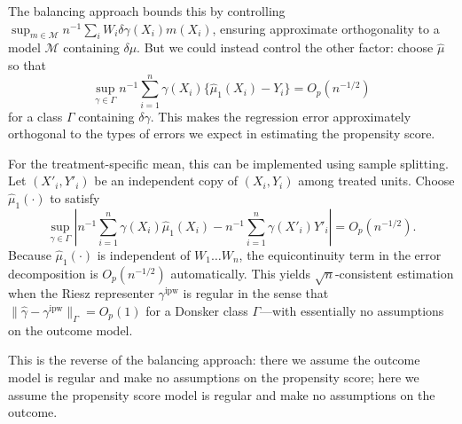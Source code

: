 \documentclass{article}
\theoremstyle{definition}
\newcommand{\model}{\mathcal{M}}
\newcommand{\<}{\langle}
\renewcommand{\>}{\rangle}
\begin{document}
\begin{refsection}
The balancing approach bounds this by controlling $\sup_{m \in \model} n^{-1} \sum_i W_i \delta\gamma(X_i) m(X_i)$, ensuring approximate orthogonality to a model $\model$ containing $\delta \mu$. But we could instead control the other factor: choose $\hat \mu$ so that
\begin{equation}
\sup_{\gamma \in \Gamma} n^{-1} \sum_{i=1}^n \gamma(X_i) \{\hat \mu_1(X_i) - Y_i\} = O_p(n^{-1/2})
\end{equation}
for a class $\Gamma$ containing $\delta\gamma$. This makes the regression error approximately orthogonal to the types of errors we expect in estimating the propensity score.

For the treatment-specific mean, this can be implemented using sample splitting. Let $(X'_i, Y'_i)$ be an independent copy of $(X_i, Y_i)$ among treated units. Choose $\hat \mu_1(\cdot)$ to satisfy
\begin{equation}
\sup_{\gamma \in \Gamma} \left|n^{-1} \sum_{i=1}^n \gamma(X_i) \hat \mu_1(X_i) - n^{-1} \sum_{i=1}^n \gamma(X'_i) Y'_i\right| = O_p(n^{-1/2}).
\end{equation}
Because $\hat \mu_1(\cdot)$ is independent of $W_1 \ldots W_n$, the equicontinuity term in the error decomposition is $O_p(n^{-1/2})$ automatically. This yields $\sqrt{n}$-consistent estimation when the Riesz representer $\gamma^{\text{ipw}}$ is regular in the sense that $\|\hat\gamma - \gamma^{\text{ipw}}\|_\Gamma = O_p(1)$ for a Donsker class $\Gamma$---with essentially no assumptions on the outcome model.

This is the reverse of the balancing approach: there we assume the outcome model is regular and make no assumptions on the propensity score; here we assume the propensity score model is regular and make no assumptions on the outcome.

\ifarxiv
\printbibliography[title=Appendix References]
\end{refsection}
\else
\ifsupp

\fi
\fi
\fi
\end{document}
